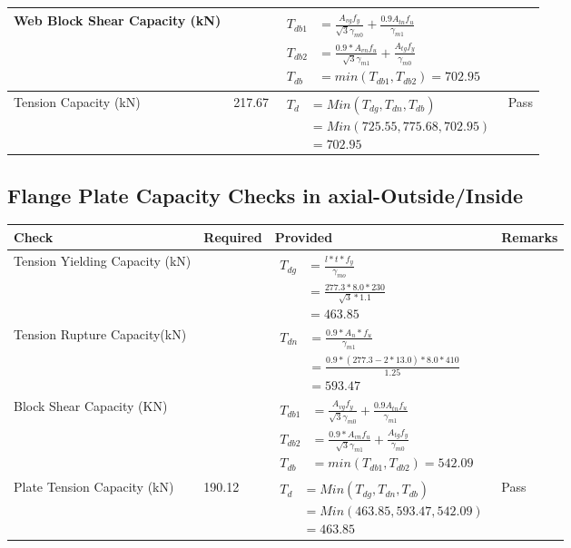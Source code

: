 \documentclass{article}%
\begin{document}
\begin{longtable}{|p{4cm}|p{6cm}|p{5.5cm}|p{1.5cm}|}
\hline%
Web Block Shear Capacity (kN)&&$\begin{aligned}T_{db1} &= \frac{A_{vg} f_{y}}{\sqrt{3} \gamma_{m0}} + \frac{0.9 A_{tn} f_{u}}{\gamma_{m1}}\\ T_{db2} &= \frac{0.9*A_{vn} f_{u}}{\sqrt{3} \gamma_{m1}} + \frac{A_{tg} f_{y}}{\gamma_{m0}}\\ T_{db} &= min(T_{db1}, T_{db2})= 702.95\end{aligned}$&\\%
\hline%
Tension Capacity (kN)&217.67&$\begin{aligned} T_d &= Min(T_{dg},T_{dn},T_{db})\\ &= Min(725.55,775.68,702.95)\\ &=702.95\end{aligned}$&Pass\\%
\hline%
\end{longtable}

%
\subsection{Flange Plate Capacity Checks in axial{-}Outside/Inside }%
\label{subsec:FlangePlateCapacityChecksinaxial{-}Outside/Inside}%
\renewcommand{\arraystretch}{1.2}%
\begin{longtable}{|p{4cm}|p{6cm}|p{5.5cm}|p{1.5cm}|}%
\hline%
\rowcolor{OsdagGreen}%
Check&Required&Provided&Remarks\\%
\hline%
\endhead%
\hline%
Tension Yielding Capacity (kN)&&$\begin{aligned} T_{dg} &= \frac{l*t*f_y}{\gamma_{mo}}\\ &=\frac{277.3*8.0*230}{\sqrt{3}*1.1}\\ &=463.85\end{aligned}$&\\%
\hline%
Tension Rupture Capacity(kN)&&$\begin{aligned} T_{dn} &= \frac{0.9*A_{n}*f_u}{\gamma_{m1}}\\ &=\frac{0.9*(277.3-2*13.0)*8.0*410}{1.25}\\ &=593.47\end{aligned}$&\\%
\hline%
Block Shear Capacity (KN)&&$\begin{aligned}T_{db1} &= \frac{A_{vg} f_{y}}{\sqrt{3} \gamma_{m0}} + \frac{0.9 A_{tn} f_{u}}{\gamma_{m1}}\\ T_{db2} &= \frac{0.9*A_{vn} f_{u}}{\sqrt{3} \gamma_{m1}} + \frac{A_{tg} f_{y}}{\gamma_{m0}}\\ T_{db} &= min(T_{db1}, T_{db2})= 542.09\end{aligned}$&\\%
\hline%
Plate Tension Capacity  (kN)&190.12&$\begin{aligned} T_d &= Min(T_{dg},T_{dn},T_{db})\\ &= Min(463.85,593.47,542.09)\\ &=463.85\end{aligned}$&Pass\\%
\hline%
\end{longtable}
\end{document}
